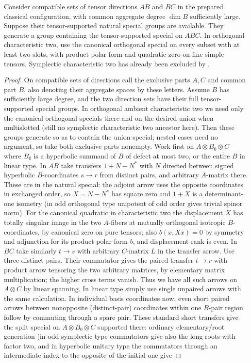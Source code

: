 \begin{lemma}
\label{fb:tensor-merging}
Consider compatible sets of tensor directions \(A B\) and \(B C\) in the
prepared classical configuration, with common aggregate degree \(\dim B\)
sufficiently large.  Suppose their tensor-supported natural special groups
are available.  They generate a group containing the tensor-supported special
on \(A B C\).  In orthogonal characteristic two, use the canonical orthogonal
special on every subset with at least two slots, with product polar form and
quadratic zero on fine simple tensors.  Symplectic characteristic two has
already been excluded by .
\end{lemma}
\begin{proof}

On compatible sets of directions call the exclusive parts \(A,C\) and common part \(B\), also denoting their aggregate spaces by these letters. Assume \(B\) has sufficiently large degree, and the two direction sets have their full tensor-supported special groups. In orthogonal ambient characteristic two we need only the canonical orthogonal specials there and on the desired union when multislotted (still no symplectic characteristic two ancestor here). Then these groups generate so as to contain the union special; nested cases need no argument, so take both exclusive parts nonempty. Work first on \(A\otimes B_0\otimes C\) where \(B_0\) is a hyperbolic summand of \(B\) of defect at most two, or the entire \(B\) in linear type. In \(AB\) take transfers \(1+N-N^*\) with \(N\) directed between signed hyperbolic \(B\)-coordinates \(s\to r\) from distinct pairs, and arbitrary \(A\)-matrix there. These are in the natural special: the adjoint arrow uses the opposite coordinates in exchanged order, so \(X=N-N^*\) has square zero and \(1+X\) is a determinant-one isometry (in odd orthogonal type unipotent of odd order gives trivial spinor norm). For the canonical quadratic in characteristic two the displacement \(X\) has totally singular image in the two \(A\)-fibers at mutually orthogonal isotropic \(B\)-coordinates, by canonical zero on pure tensors; also \(b(x,Xx)=0\) by symmetry and adjunction for its product polar form \(b\), and displacement rank is even. In \(BC\) take similarly \(t\to s\) with arbitrary \(C\)-matrix \(L\) in the transfer arrow. Use three distinct pairs. Their commutator gives the paired transfer \(t\to r\) with product arrow tensoring the two arbitrary matrices, by elementary matrix multiplication; the higher cross terms vanish. Thus we have all such arrows on \(A\otimes C\) by linear spanning. In linear type simply use single unpaired arrows with the same calculation. In individual basis coordinates now, even short paired arrows between nonopposite (distinct-pair) coordinates within one \(B\)-pair region follow by commuting through a spare pair. These standard short transfers give the split special on \(A\otimes B_0\otimes C\) supported there: ordinary elementary/root generation (in odd symplectic type commutators give also the long roots with factor two, and in hyperbolic unitary type the commutators through an intermediate index to the opposite of the initial one give 
\end{proof}
